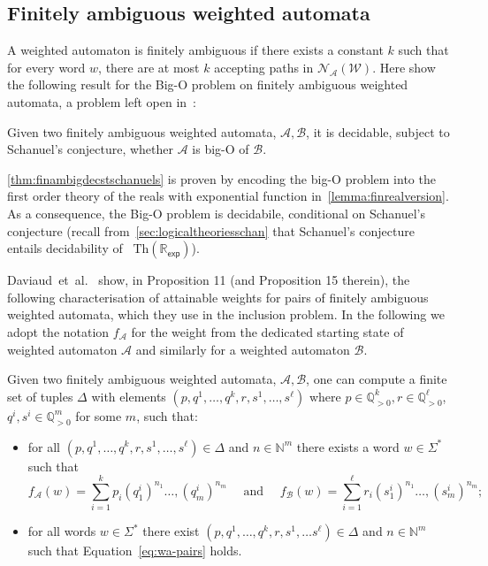 \documentclass{lmcs}
\theoremstyle{plain}
\theoremstyle{definition}
\theoremstyle{remark}
\newcommand\nfa{\mathcal{N}}
\newcommand\wa{\mathcal{W}}
\newcommand\nfaof[2]{\nfa_{#2}(#1)}
\newcommand{\rexp}{$\mathrm{Th}(\mathbb R_{\mathsf{exp}})$}
\begin{document}
\subsection{Finitely ambiguous weighted automata}
A weighted automaton is finitely ambiguous if there exists a constant $k$ such that for every word $w$, there are at most $k$ accepting paths in  $\nfaof{\wa}{\mathcal{A}}$. Here show the following result for the Big-O problem on finitely ambiguous weighted automata, a problem left open in~\cite{ChistikovKMP20}:

\begin{thm}\label{thm:finambigdecstschanuels}
  Given two finitely ambiguous weighted automata, $\mathcal{A},\mathcal{B}$, it is decidable, subject to Schanuel's conjecture, whether $\mathcal{A}$ is big-O of $\mathcal{B}$.
\end{thm}

\cref{thm:finambigdecstschanuels} is proven by encoding the big-O problem into  the first order theory of the reals with exponential function in~\cref{lemma:finrealversion}. As a consequence, the Big-O problem is decidabile, conditional on Schanuel's conjecture (recall from~\cref{sec:logicaltheoriesschan} that Schanuel's conjecture entails decidability of ~\rexp).

Daviaud~et~al.~\cite{DAVIAUD202178} show, in Proposition 11 (and Proposition 15 therein), the following characterisation of attainable weights for pairs of finitely ambiguous weighted automata, which they use in the inclusion problem. In the following we adopt the notation $f_{\mathcal{A}}$ for the weight from the dedicated starting state of weighted automaton $\mathcal{A}$ and similarly for a weighted automaton $\mathcal{B}$.

\begin{thm}
Given two finitely ambiguous weighted automata, $\mathcal{A},\mathcal{B}$, one can compute a finite set of tuples $\Delta$ with elements $({p},{q}^1,\dots, {q}^{k}, {r},{s}^1,\dots, {s}^{\ell})$ where $p\in\mathbb{Q}_{>0}^{k},r\in\mathbb{Q}_{>0}^{\ell}$, $q^{i},s^{i} \in \mathbb{Q}_{>0}^{m}$ for some $m$, such that:
\begin{itemize}
\item for all $({p},{q}^1,\dots, {q}^{k}, {r},{s}^1,\dots, {s}^{\ell}) \in \Delta$ and ${n} \in \mathbb{N}^m$ there exists a word $w\in \Sigma^*$ such that
\begin{equation}
\label{eq:wa-pairs}
f_\mathcal{A}(w) = \sum_{i=1}^{k} p_i{({q}^i_1)}^{n_1}\dots, {({q}^i_m)}^{n_m}
\quad \text{ and } \quad f_\mathcal{B}(w) = \sum_{i=1}^{\ell} r_i{({s}^i_1)}^{n_1}\dots, {({s}^i_m)}^{n_m};
\end{equation}
\item for all words  $w\in \Sigma^*$ there exist  $({p},{q}^1,\dots, {q}^{k}, {r},{s}^1,\dots {s}^{\ell}) \in \Delta$ and ${n} \in \mathbb{N}^m$  such that Equation~\eqref{eq:wa-pairs} holds.
\end{itemize}

\end{thm}
\end{document}
